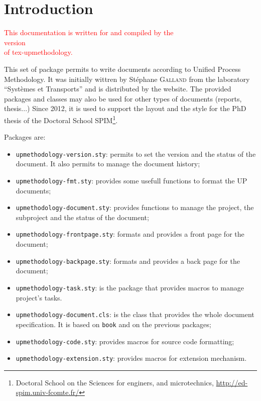 \documentclass[book]{upmethodology-document}
\begin{document}
\tableofcontents

\listoffigures

\listoftables


\chapter{Introduction}

\begin{center}
\textcolor{red}{\large This documentation is written for and compiled by the\\version \UPMVERSION\\of tex-upmethodology.}
\end{center}

This set of package permits to write documents according to Unified Process Methodology. It was initially wittren by St\'ephane \textsc{Galland} from the laboratory ``Syst\`emes et Transports'' and is distributed by the \arakhneorg website.
The provided packages and classes may also be used for other types of documents (reports, thesis...) Since 2012, it is used to support the layout and the style for the PhD thesis of the Doctoral School SPIM\footnote{Doctoral School on the Sciences for enginers, and microtechnics, \href{http://ed-spim.univ-fcomte.fr/}{http://ed-spim.univ-fcomte.fr/}}.

Packages are:
\begin{itemize}
\item \texttt{upmethodology-version.sty}: permits to set the version and the status of the document. It also permits to manage the document history;
\item \texttt{upmethodology-fmt.sty}: provides some usefull functions to format the UP documents;
\item \texttt{upmethodology-document.sty}: provides functions to manage the project, the subproject and the status of the document;
\item \texttt{upmethodology-frontpage.sty}: formats and provides a front page for the document;
\item \texttt{upmethodology-backpage.sty}: formats and provides a back page for the document;
\item \texttt{upmethodology-task.sty}: is the \LaTeXe\xspace package that provides macros to manage project's tasks.
\item \texttt{upmethodology-document.cls}: is the \LaTeXe\xspace class that provides the whole document specification. It is based on \texttt{book} and on the previous packages;
\item \texttt{upmethodology-code.sty}: provides macros for source code formatting;
\item \texttt{upmethodology-extension.sty}: provides macros for extension mechanism.
\end{itemize}
\end{document}
